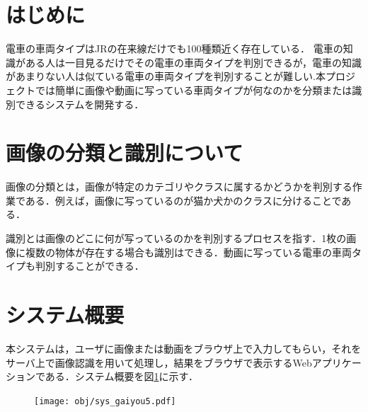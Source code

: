 \maketitle
\begin{multicols*}{2} %



\section{はじめに}
電車の車両タイプはJRの在来線だけでも100種類近く存在している．
電車の知識がある人は一目見るだけでその電車の車両タイプを判別できるが，電車の知識があまりない人は似ている電車の車両タイプを判別することが難しい.本プロジェクトでは簡単に画像や動画に写っている車両タイプが何なのかを分類または識別できるシステムを開発する．

\section{画像の分類と識別について}
画像の分類とは，画像が特定のカテゴリやクラスに属するかどうかを判別する作業である．例えば，画像に写っているのが猫か犬かのクラスに分けることである．

識別とは画像のどこに何が写っているのかを判別するプロセスを指す．1枚の画像に複数の物体が存在する場合も識別はできる．動画に写っている電車の車両タイプも判別することができる．

\section{システム概要}
本システムは，ユーザに画像または動画をブラウザ上で入力してもらい，それをサーバ上で画像認識を用いて処理し，結果をブラウザで表示するWebアプリケーションである．システム概要を図\ref{abc}に示す．
\begin{figure} %
	\label{abc}
	\centering
	\texttt{[image: obj/sys\_gaiyou5.pdf]}
\end{figure}


\end{multicols*}
